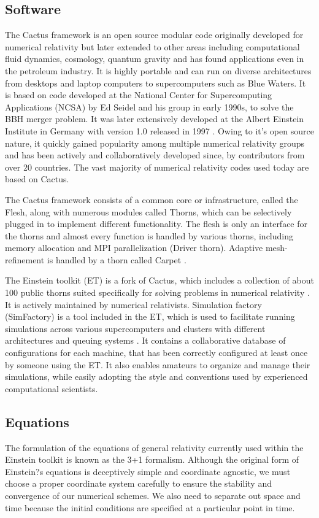 \documentclass[aps,twocolumn,secnumarabic,nobalancelastpage,amsmath,amssymb,
nofootinbib]{revtex4}
\begin{document}
	\subsection{Software}
	The Cactus framework is an open source modular code originally developed for numerical relativity but later extended to other areas including computational fluid dynamics, cosmology, quantum gravity and has found applications even in the petroleum industry. It is highly portable and can run on diverse architectures from desktops and laptop computers to supercomputers such as Blue Waters. It is based on code developed at the National Center for Supercomputing Applications (NCSA) by Ed Seidel and his group in early 1990s, to solve the BBH merger problem. It was later extensively developed at the Albert Einstein Institute in Germany with version 1.0 released in 1997 \cite{cactus}. Owing to it's open source nature, it quickly gained popularity among multiple numerical relativity groups and has been actively and collaboratively developed since, by contributors from over 20 countries. The vast majority of numerical relativity codes used today are based on Cactus.
		\newline
	
	The Cactus framework consists of a common core or infrastructure, called the Flesh, along with numerous modules	called Thorns, which can be selectively plugged in to implement different functionality. The flesh is only an interface for the thorns and almost every function is handled by various thorns, including memory allocation and MPI parallelization (Driver thorn). Adaptive mesh-refinement is handled by a thorn called Carpet \cite{living}.
		\newline
	
	The Einstein toolkit (ET) is a fork of Cactus, which includes a collection of about 100 public thorns suited specifically for solving problems in numerical relativity \cite{ET}. It is actively maintained by numerical relativists. Simulation factory (SimFactory) is a tool included in the ET, which is used to facilitate running simulations across various supercomputers and clusters with different architectures and queuing systems \cite{intro}. It contains a collaborative database of configurations for each machine, that has been correctly configured at least once by someone using the ET. It also enables amateurs to organize and manage their simulations, while easily adopting the style and conventions used by experienced computational scientists.		
	
	\subsection{Equations}
	The formulation of the equations of general relativity currently used within the Einstein toolkit is known as the 3+1 formalism. Although the original form of Einstein?s equations is deceptively simple and coordinate agnostic, we must choose a proper coordinate system carefully to ensure the stability and convergence of our numerical schemes. We also need to separate out space and time because the initial conditions are specified at a particular point in time.
		\newline
	
\end{document}
